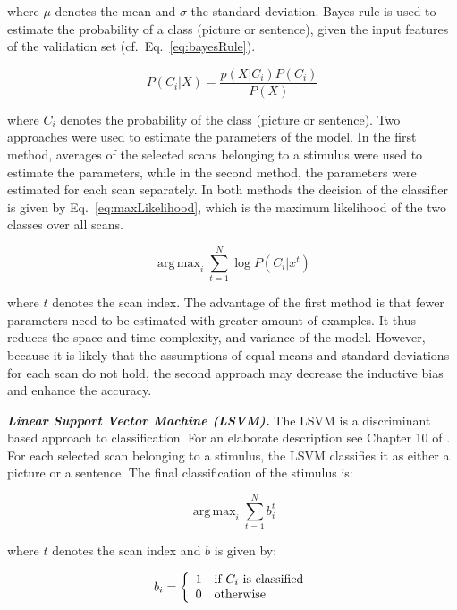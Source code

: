 \documentclass[preprint,journal,11pt]{vgtc}
\begin{document}
where $\mu$ denotes the mean and $\sigma$ the standard deviation. Bayes rule is used to estimate the probability of a class (picture or sentence), given the input features of the validation set (cf.~Eq.~\ref{eq:bayesRule}).

\begin{equation}
\label{eq:bayesRule}
P(C_{i}|X) = \frac{p(X|C_{i})P(C_{i})}{P(X)}
\end{equation}

where $C_i$ denotes the probability of the class (picture or sentence). Two approaches were used to estimate the parameters of the model. In the first method, averages of the selected scans belonging to a stimulus were used to estimate the parameters, while in the second method, the parameters were estimated for each scan separately. In both methods the decision of the classifier is given by Eq.~\ref{eq:maxLikelihood}, which is the maximum likelihood of the two classes over all scans.

\begin{equation}
\label{eq:maxLikelihood}
\operatorname{arg\,max}_i \sum_{t=1}^{N}{\log{P(C_{i}|x^{t})}}
\end{equation}

where $t$ denotes the scan index. The advantage of the first method is that fewer parameters need to be estimated with greater amount of examples. It thus reduces the space and time complexity, and variance of the model. However, because it is likely that the assumptions of equal means and standard deviations for each scan do not hold, the second approach may decrease the inductive bias and enhance the accuracy.

\textbf{\emph{Linear Support Vector Machine (LSVM).}} The LSVM is a discriminant based approach to classification. For an elaborate description see Chapter 10 of \cite{bk:2004aplay}. For each selected scan belonging to a stimulus, the LSVM classifies it as either a picture or a sentence. The final classification of the stimulus is:

\begin{equation}
\label{eq:argmaxsvm}
\operatorname{arg\,max}_i \sum_{t=1}^{N}{b_{i}^{t}}
\end{equation}

where $t$ denotes the scan index and $b$ is given by:

\begin{equation}
b_{i} = \left\{
\begin{array}{l l}
1 \quad \text{if $C_{i}$ is classified}\\
0 \quad \text{otherwise}\\
\end{array} \right.
\end{equation}
\end{document}
